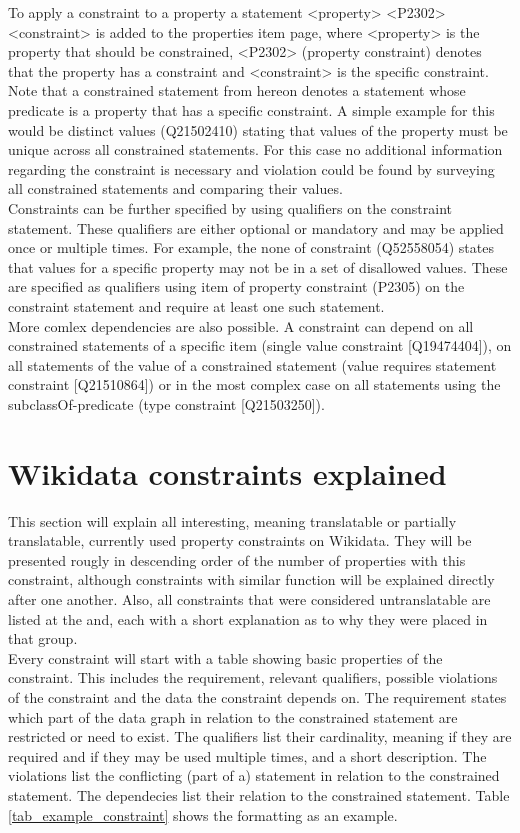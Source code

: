 \documentclass[hyperref,bachelorofscience]{cgvpub}
\begin{document}
To apply a constraint to a property a statement <property> <P2302> <constraint> is added to the properties item page, where <property> is the property that should be constrained, <P2302> (property constraint) denotes that the property has a constraint and <constraint> is the specific constraint. Note that a constrained statement from hereon denotes a statement whose predicate is a property that has a specific constraint. A simple example for this would be distinct values (Q21502410) stating that values of the property must be unique across all constrained statements. For this case no additional information regarding the constraint is necessary and violation could be found by surveying all constrained statements and comparing their values.\\
Constraints can be further specified by using qualifiers on the constraint statement. These qualifiers are either optional or mandatory and may be applied once or multiple times. For example, the none of constraint (Q52558054) states that values for a specific property may not be in a set of disallowed values. These are specified as qualifiers using item of property constraint (P2305) on the constraint statement and require at least one such statement.\\
More comlex dependencies are also possible. A constraint can depend on all constrained statements of a specific item (single value constraint [Q19474404]), on all statements of the value of a constrained statement (value requires statement constraint [Q21510864]) or in the most complex case on all statements using the subclassOf-predicate (type constraint [Q21503250]).


\section{Wikidata constraints explained}
This section will explain all interesting, meaning translatable or partially translatable, currently used property constraints on Wikidata. They will be presented rougly in descending order of the number of properties with this constraint, although constraints with similar function will be explained directly after one another. Also, all constraints that were considered untranslatable are listed at the and, each with a short explanation as to why they were placed in that group.\\

Every constraint will start with a table showing basic properties of the constraint. This includes the requirement, relevant qualifiers, possible violations of the constraint and the data the constraint depends on. The requirement states which part of the data graph in relation to the constrained statement are restricted or need to exist. The qualifiers list their cardinality, meaning if they are required and if they may be used multiple times, and a short description. The violations list the conflicting (part of a) statement in relation to the constrained statement. The dependecies list their relation to the constrained statement. Table \ref{tab_example_constraint} shows the formatting as an example.
\end{document}
